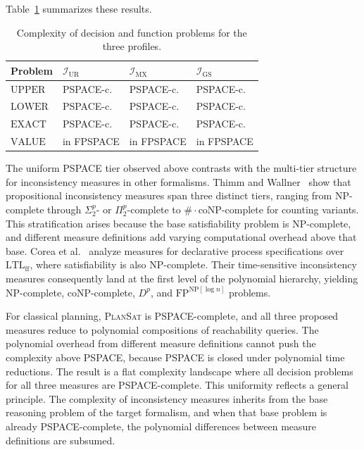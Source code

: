 Table~\ref{tab:decision_complexity} summarizes these results.

\begin{table}[ht]
    \centering
    \begin{tabular}{llll}
        \toprule
        Problem        & $\mathcal{I}_{\text{UR}}$ & $\mathcal{I}_{\text{MX}}$ & $\mathcal{I}_{\text{GS}}$ \\
        \midrule
        $\text{UPPER}$ & PSPACE-c.                 & PSPACE-c.                 & PSPACE-c.                 \\
        $\text{LOWER}$ & PSPACE-c.                 & PSPACE-c.                 & PSPACE-c.                 \\
        $\text{EXACT}$ & PSPACE-c.                 & PSPACE-c.                 & PSPACE-c.                 \\
        $\text{VALUE}$ & in FPSPACE                & in FPSPACE                & in FPSPACE                \\
        \bottomrule
    \end{tabular}
    \caption{Complexity of decision and function problems for the three profiles.}
    \label{tab:decision_complexity}
\end{table}

The uniform PSPACE tier observed above contrasts with the multi-tier structure for inconsistency measures in other formalisms. Thimm and Wallner~\cite{Thimm2016} show that propositional inconsistency measures span three distinct tiers, ranging from NP-complete through $\Sigma^p_2$- or $\Pi^p_2$-complete to $\#\cdot\text{coNP}$-complete for counting variants. This stratification arises because the base satisfiability problem is NP-complete, and different measure definitions add varying computational overhead above that base. Corea et al.~\cite{Corea2022} analyze measures for declarative process specifications over $\text{LTL}_{\text{ff}}$, where satisfiability is also NP-complete. Their time-sensitive inconsistency measures consequently land at the first level of the polynomial hierarchy, yielding NP-complete, coNP-complete, $D^p$, and $\text{FP}^{\text{NP}[\log n]}$ problems.

For classical planning, \textsc{PlanSat} is PSPACE-complete, and all three proposed measures reduce to polynomial compositions of reachability queries. The polynomial overhead from different measure definitions cannot push the complexity above PSPACE, because PSPACE is closed under polynomial time reductions. The result is a flat complexity landscape where all decision problems for all three measures are PSPACE-complete. This uniformity reflects a general principle. The complexity of inconsistency measures inherits from the base reasoning problem of the target formalism, and when that base problem is already PSPACE-complete, the polynomial differences between measure definitions are subsumed.

